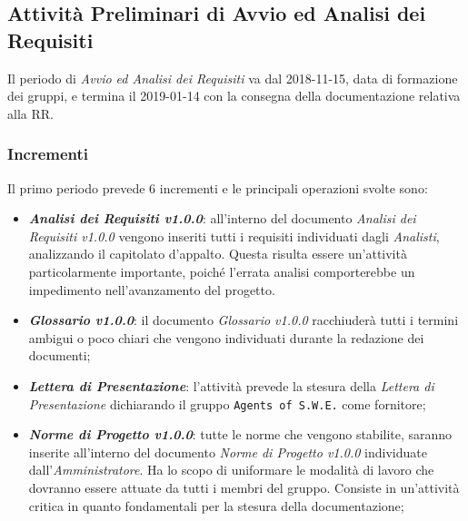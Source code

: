 \subsection{Attività Preliminari di Avvio ed Analisi dei Requisiti}
\label{Apaar}

Il periodo di \textit{Avvio ed Analisi dei Requisiti} va dal 2018-11-15, data di formazione dei gruppi, e termina il 2019-01-14 con la consegna della documentazione relativa alla RR.

\newpage
\subsubsection{Incrementi}

Il primo periodo prevede 6 incrementi e le principali operazioni svolte sono: 
\begin{itemize}
	\item \textbf{\textit{Analisi dei Requisiti v1.0.0}}: all'interno del documento \textit{Analisi dei Requisiti v1.0.0} vengono inseriti tutti i requisiti individuati dagli \textit{Analisti}, analizzando il capitolato d'appalto. Questa risulta essere un'attività particolarmente importante, poiché l'errata analisi comporterebbe un impedimento nell'avanzamento del progetto.
	\item \textbf{\textit{Glossario v1.0.0}}: il documento \textit{Glossario v1.0.0} racchiuderà tutti i termini ambigui o poco chiari che vengono individuati durante la redazione dei documenti;
	\item \textbf{\textit{Lettera di Presentazione}}: l'attività prevede la stesura della \textit{Lettera di Presentazione} dichiarando il gruppo \texttt{Agents of S.W.E.} come fornitore;
	\item \textbf{\textit{Norme di Progetto v1.0.0}}: tutte le norme che vengono stabilite, saranno inserite all'interno del documento \textit{Norme di Progetto v1.0.0} individuate dall'\textit{Amministratore}. Ha lo scopo di uniformare le modalità di lavoro che dovranno essere attuate da tutti i membri del gruppo. Consiste in un'attività critica in quanto fondamentali per la stesura della documentazione;
	

\end{itemize}
